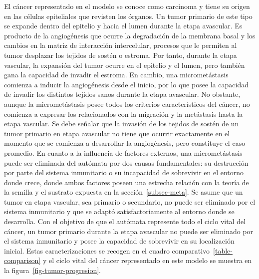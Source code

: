 El c\'ancer representado en el modelo se conoce como carcinoma y tiene su origen en las c\'elulas epiteliales que revisten los \'organos. Un tumor primario de este tipo se expande dentro del epitelio y hacia el lumen durante la etapa avascular. Es producto de la angiog\'enesis que ocurre la degradaci\'on de la membrana basal y los cambios en la matriz de interacci\'on intercelular, procesos que le permiten al tumor desplazar los tejidos de sost\'en o estroma. Por tanto, durante la etapa vascular, la expansi\'on del tumor ocurre en el epitelio y el lumen, pero tambi\'en gana la capacidad de invadir el estroma. En cambio, una micromet\'astasis comienza a inducir la angiog\'enesis desde el inicio, por lo que posee la capacidad de invadir los distintos tejidos sanos durante la etapa avascular. No obstante, aunque la micromet\'astasis posee todos los criterios caracter\'isticos del c\'ancer, no comienza a expresar los relacionados con la migraci\'on y la met\'astasis hasta la etapa vascular. Se debe se\~nalar que la invasi\'on de los tejidos de sost\'en de un tumor primario en etapa avascular no tiene que ocurrir exactamente en el momento que se comienza a desarrollar la angiog\'enesis, pero constituye el caso promedio. En cuanto a la influencia de factores externos, una micromet\'astasis puede ser eliminada del aut\'omata por dos causas fundamentales: su destrucci\'on por parte del sistema inmunitario o su incapacidad de sobrevivir en el entorno donde crece, donde ambos factores poseen una estrecha relaci\'on con la teor\'ia de la semilla y el sustrato expuesta en la secci\'on~\ref{subsec-meta}. Se asume que un tumor en etapa vascular, sea primario o secundario, no puede ser eliminado por el sistema inmunitario y que se adapt\'o satisfactoriamente al entorno donde se desarrolla. Con el objetivo de que el aut\'omata represente todo el ciclo vital del c\'ancer, un tumor primario durante la etapa avascular no puede ser eliminado por el sistema inmunitario y posee la capacidad de sobrevivir en su localizaci\'on inicial. Estas caracterizaciones se recogen en el cuadro comparativo~\ref{table-comparison} y el ciclo vital del c\'ancer representado en este modelo se muestra en la figura~\ref{fig-tumor-progresion}. 

